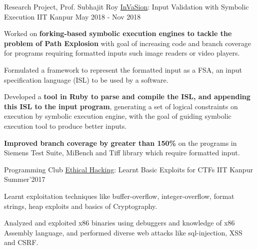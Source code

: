 \begin{cventries}


  \cventry
    {Research Project, Prof. Subhajit Roy} %
    {\href{https://arxiv.org/abs/2104.01438}{InVaSion}: Input Validation with Symbolic Execution} %
    {IIT Kanpur} %
    {May 2018 - Nov 2018} %
    {
      \begin{cvitems} %
      \item {Worked on \textbf{forking-based symbolic execution engines to tackle the problem of Path Explosion} with goal of increasing code and branch coverage for programs requiring formatted inputs such image readers or video players.}
      \item {Formulated a framework to represent the formatted input as a FSA, an input specification language (ISL) to be used by a software.}
        \item {Developed a \textbf{tool in Ruby to parse and compile the ISL, and appending this ISL to the input program}, generating a set of logical constraints on execution by symbolic execution engine, with the goal of guiding symbolic execution tool to produce better inputs.}
        \item {\textbf{Improved branch coverage by greater than 150\%} on the programs in Siemens Test Suite, MiBench and Tiff library which require formatted input.}
      \end{cvitems}
    }%



  \cventry
    {Programming Club} %
    {\href{https://github.com/ayush268/Ethical\_Hacking}{Ethical Hacking}: Learnt Basic Exploits for CTFs} %
    {IIT Kanpur} %
    {Summer'2017} %
    {
      \begin{cvitems} %
        \item {Learnt exploitation techniques like buffer-overflow, integer-overflow, format strings, heap exploits and basics of Cryptography.}
        \item {Analyzed and exploited x86 binaries using debuggers and knowledge of x86 Assembly language, and performed diverse web attacks like sql-injection, XSS and CSRF.}
      \end{cvitems}
    }




\end{cventries}
